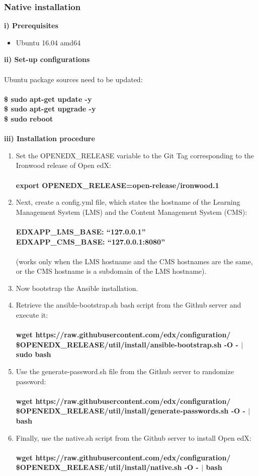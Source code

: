 \documentclass[12pt]{article}
\begin{document}
\subsubsection{Native installation}
\textbf{i) Prerequisites}
\begin{itemize}
	\item Ubuntu 16.04 amd64
\end{itemize}
\textbf{ii) Set-up configurations}\\\\
Ubuntu package sources need to be updated:\\\\
\textbf{\$ sudo apt-get update -y\\
	\$ sudo apt-get upgrade -y\\
	\$ sudo reboot\\\\
}
\textbf{iii) Installation procedure}
\begin{enumerate}
	\item Set the OPENEDX\_RELEASE variable to the Git Tag corresponding to the Ironwood release of Open edX:\\\\
	\textbf{export OPENEDX\_RELEASE=open-release/ironwood.1}
	\item Next, create a config.yml file, which states the hostname of the Learning Management System (LMS) and the Content Management System (CMS):\\\\
	\textbf{EDXAPP\_LMS\_BASE: “127.0.0.1”}\\
	\textbf{EDXAPP\_CMS\_BASE: “127.0.0.1:8080”}\\\\
	(works only when the LMS hostname and the CMS hostnames are the same, or the CMS hostname is a subdomain of the LMS hostname).
	\item Now bootstrap the Ansible installation.
	\item Retrieve the ansible-bootstrap.sh bash script from the Github server and execute it:\\\\
	\textbf{wget https://raw.githubusercontent.com/edx/configuration/\\ \$OPENEDX\_RELEASE/util/install/ansible-bootstrap.sh -O - $|$ sudo bash}
	\item Use the generate-password.sh file from the Github server to randomize password:\\\\
	\textbf{wget https://raw.githubusercontent.com/edx/configuration/\\ \$OPENEDX\_RELEASE/util/install/generate-passwords.sh -O - $|$ bash}
	\item Finally, use the native.sh script from the Github server to install Open edX:\\\\
	\textbf{wget https://raw.githubusercontent.com/edx/configuration/\\ \$OPENEDX\_RELEASE/util/install/native.sh -O - $|$ bash}
	
\end{enumerate}
\end{document}
